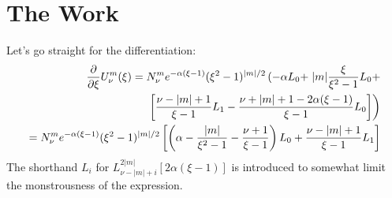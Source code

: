 \documentclass[13pt,a4paper]{article}
\begin{document}
\section{The Work}
    Let's go straight for the differentiation:
    \begin{align}
	\frac{\partial}{\partial \xi}U_{\nu}^{m}(\xi) = 
	N_{\nu}^m e^{-\alpha(\xi - 1)} (\xi^2 - 1)^{|m|/2}
	\left(
	    -\alpha 
	    L_0 + \right. 
	    |m| \frac{\xi}{ \xi^2 - 1}
	    L_0 + \notag\\ 
	    \left.\notag
	    \left[
		\frac{\nu - |m| + 1}{\xi - 1}L_1 - 
		\frac{\nu + |m| + 1 - 2\alpha(\xi - 1)}{\xi - 1}
		L_0
	    \right]
	\right)\\
	= N_{\nu}^m e^{-\alpha(\xi - 1)} (\xi^2 - 1)^{|m|/2}
	\left[
	    \left(
		\alpha - \frac{|m|}{\xi^2 - 1} - \frac{\nu + 1}{\xi - 1}
	    \right) L_0 + 
	    \frac{\nu - |m| + 1}{\xi - 1}L_1
	\right]
	\label{eq:dU}
    \end{align}
    The shorthand $L_i$ for $L_{\nu - |m| + i}^{2|m|}[2\alpha(\xi -
    1)]$ is introduced to somewhat limit the monstrousness of the expression.
    
\end{document}
